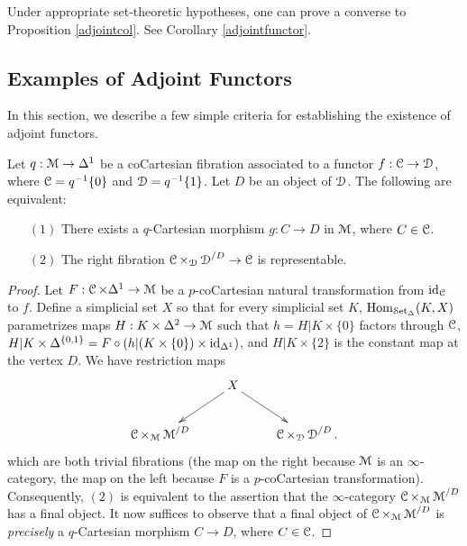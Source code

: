 \begin{remark}
Under appropriate set-theoretic hypotheses, one can prove a converse to Proposition \ref{adjointcol}. See Corollary \ref{adjointfunctor}. 
\end{remark}

\subsection{Examples of Adjoint Functors}\label{afunc4}

In this section, we describe a few simple criteria for establishing the existence of adjoint functors.

\begin{lemma}\label{adjfunclemma}
Let $q: \operatorname{\mathcal{M}} \rightarrow \Delta^1$ be a coCartesian fibration associated to a functor
$f: \operatorname{\mathcal{C}} \rightarrow \operatorname{\mathcal{D}}$, where $\operatorname{\mathcal{C}} = q^{-1} \{0\}$ and $\operatorname{\mathcal{D}} = q^{-1} \{1\}$. Let $D$ be an object of $\operatorname{\mathcal{D}}$. The following are equivalent:
\begin{itemize}
\item[$(1)$] There exists a $q$-Cartesian morphism $g: C \rightarrow D$ in $\operatorname{\mathcal{M}}$, where
$C \in \operatorname{\mathcal{C}}$.
\item[$(2)$] The right fibration $\operatorname{\mathcal{C}} \times_{\operatorname{\mathcal{D}}} \operatorname{\mathcal{D}}^{/D} \rightarrow \operatorname{\mathcal{C}}$ is
representable.
\end{itemize}
\end{lemma}

\begin{proof}
Let $F: \operatorname{\mathcal{C}} \times \Delta^1 \rightarrow \operatorname{\mathcal{M}}$ be
a $p$-coCartesian natural transformation from $\operatorname{id}_{\operatorname{\mathcal{C}}}$ to $f$. Define a simplicial
set $X$ so that for every simplicial set $K$, $\operatorname{Hom}_{\operatorname{\mathcal{S}et_{\Delta}}}(K,X)$ parametrizes
maps $H: K \times \Delta^2 \rightarrow \operatorname{\mathcal{M}}$ such that
$h=H | K \times \{0\}$ factors through $\operatorname{\mathcal{C}}$, $H | K \times \Delta^{ \{0,1\} } = F \circ 
(h|(K \times \{0\}) \times \operatorname{id}_{\Delta^1})$, and $H | K \times \{2\}$ is the constant map at the vertex $D$. We have restriction maps
$$ \xymatrix{ & X \ar[dr] \ar[dl] & \\
\calC \times_{\calM} \calM^{/D} & & \calC \times_{\calD} \calD^{/D}.}$$
which are both trivial fibrations (the map on the right because $\operatorname{\mathcal{M}}$ is an $\infty$-category, the map on the left because $F$ is a $p$-coCartesian transformation). Consequently, $(2)$ is equivalent to 
the assertion that the $\infty$-category $\operatorname{\mathcal{C}} \times_{\operatorname{\mathcal{M}}} \operatorname{\mathcal{M}}^{/D}$ has a final object.
It now suffices to observe that a final object of $\operatorname{\mathcal{C}} \times_{\operatorname{\mathcal{M}}} \operatorname{\mathcal{M}}^{/D}$ is {\em precisely}
a $q$-Cartesian morphism $C \rightarrow D$, where $C \in \operatorname{\mathcal{C}}$.
\end{proof}

